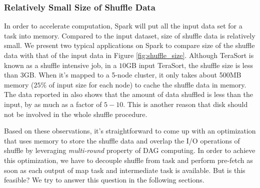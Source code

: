 \subsubsection{Relatively Small Size of Shuffle Data}\label{shufflesize}
In order to accelerate computation, Spark will put all the input data set for a task into memory. Compared to the input dataset, size of shuffle data is relatively small. We present two typical applications on Spark to compare size of the shuffle data with that of the input data in Figure \ref{fig:shuffle_size}. Although TeraSort \cite{terasort} is known as a shuffle intensive job, in a $10$GB input TeraSort, the shuffle size is less than $3$GB. When it's mapped to a 5-node cluster, it only takes about 500MB memory ($25\%$ of input size for each node) to cache the shuffle data in memory. The data reported in \cite{makingsense} also shows that the amount of data shuffled is less than the input, by as much as a factor of $5-10$. This is another reason that disk should not be involved in the whole shuffle procedure.


Based on these observations, it's straightforward to come up with an optimization that uses memory to store the shuffle data and overlap the I/O operations of shuffle
by leveraging \textit{multi-round} property of DAG computing. In order to achieve this optimization, we have to decouple shuffle from task and 
perform pre-fetch as soon as each output of map task and intermediate task is available. But is this feasible? We try to answer this question
in the following sections.
